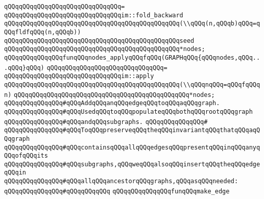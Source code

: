 \verb|qQQqqQQqqQQqqQQqqQQqqQQqqQQqqQQq=|\newline
\verb|qQQqqQQqqQQqqQQqqQQqqQQqqQQqqQQqim::fold_backward|\newline
\verb|qQQqqQQqqQQqqQQqqQQqqQQqqQQqqQQqqQQqqQQqqQQqqQQq(\\qQQq(n,qQQqb)qQQq=qQQqfldfqQQq(n,qQQqb))|\newline
\verb|qQQqqQQqqQQqqQQqqQQqqQQqqQQqqQQqqQQqqQQqqQQqqQQqseed|\newline
\verb|qQQqqQQqqQQqqQQqqQQqqQQqqQQqqQQqqQQqqQQqqQQqqQQq*nodes;|\newline
\newline
\newline
\verb|qQQqqQQqqQQqqQQqfunqQQqnodes_applyqQQqfqQQq(GRAPHqQQq{qQQqnodes,qQQq...qQQq}qQQq)|\newline
\verb|qQQqqQQqqQQqqQQqqQQqqQQqqQQqqQQq=|\newline
\verb|qQQqqQQqqQQqqQQqqQQqqQQqqQQqqQQqim::apply|\newline
\verb|qQQqqQQqqQQqqQQqqQQqqQQqqQQqqQQqqQQqqQQqqQQqqQQq(\\qQQqnqQQq=qQQqfqQQqn)|\newline
\verb|qQQqqQQqqQQqqQQqqQQqqQQqqQQqqQQqqQQqqQQqqQQqqQQq*nodes;|\newline
\newline
\newline
\newline
\newline
\newline
\verb|qQQqqQQqqQQqqQQq#qQQqAddqQQqanqQQqedgeqQQqtoqQQqaqQQqgraph.|\newline
\verb|qQQqqQQqqQQqqQQq#qQQqUsedqQQqtoqQQqpopulateqQQqbothqQQqrootqQQqgraph|\newline
\verb|qQQqqQQqqQQqqQQq#qQQqandqQQqsubgraphs.|\newline
\verb|qQQqqQQqqQQqqQQq#|\newline
\verb|qQQqqQQqqQQqqQQq#qQQqToqQQqpreserveqQQqtheqQQqinvariantqQQqthatqQQqaqQQqgraph|\newline
\verb|qQQqqQQqqQQqqQQq#qQQqcontainsqQQqallqQQqedgesqQQqpresentqQQqinqQQqanyqQQqofqQQqits|\newline
\verb|qQQqqQQqqQQqqQQq#qQQqsubgraphs,qQQqweqQQqalsoqQQqinsertqQQqtheqQQqedgeqQQqin|\newline
\verb|qQQqqQQqqQQqqQQq#qQQqallqQQqancestorqQQqgraphs,qQQqasqQQqneeded:|\newline
\verb|qQQqqQQqqQQqqQQq#qQQqqQQqqQQq|\newline
\verb|qQQqqQQqqQQqqQQqfunqQQqmake_edge|\newline
